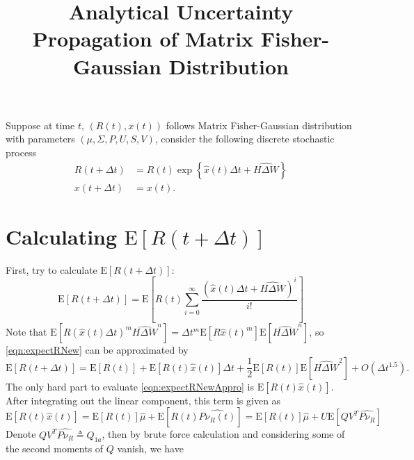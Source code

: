 \documentclass[10pt]{article}
\title{\vspace{-4ex}\textbf{Analytical Uncertainty Propagation of Matrix Fisher-Gaussian Distribution\vspace{-4ex}}}
\date{}
\newcommand{\expect}[1]{\ensuremath{\mathrm{E}\left[ #1 \right]}}
\begin{document}
\maketitle

Suppose at time $t$, $(R(t),x(t))$ follows Matrix Fisher-Gaussian distribution with parameters $(\mu,\Sigma,P,U,S,V)$, consider the following discrete stochastic process
\begin{align}
	R(t+\Delta t) &= R(t)\exp\left\{\hat{x}(t)\Delta t + \widehat{H\Delta W}\right\} \label{eqn:gyroKine} \\
	x(t+\Delta t) &= x(t).
\end{align}

\section{Calculating $\expect{R(t+\Delta t)}$}
First, try to calculate $\expect{R(t+\Delta t)}$:
\begin{equation} \label{eqn:expectRNew}
	\expect{R(t+\Delta t)} = \expect{R(t)\sum_{i=0}^{\infty}\frac{\left(\hat{x}(t)\Delta t + \widehat{H\Delta W}\right)^i}{i!}}
\end{equation}
Note that $\expect{R(\hat{x}(t)\Delta t)^m\widehat{H\Delta W}^n} = \Delta t^m\expect{R\hat{x}(t)^m}\expect{\widehat{H\Delta W}^n}$, so \eqref{eqn:expectRNew} can be approximated by
\begin{equation} \label{eqn:expectRNewAppro}
	\expect{R(t+\Delta t)} = \expect{R(t)} + \expect{R(t)\hat{x}(t)}\Delta t + \frac{1}{2}\expect{R(t)}\expect{\widehat{H\Delta W}^2} + O(\Delta t^{1.5}).
\end{equation}
The only hard part to evaluate \eqref{eqn:expectRNewAppro} is $\expect{R(t)\hat{x}(t)}$.
After integrating out the linear component, this term is given as
\begin{equation}
	\expect{R(t)\hat{x}(t)} = \expect{R(t)}\hat{\mu}+\expect{R(t)\widehat{P\nu_R(t)}} = \expect{R(t)}\hat{\mu}+U\expect{QV^T\widehat{P\nu_R}}
\end{equation}
Denote $QV^T\widehat{P\nu_R} \triangleq Q_{1a}$, then by brute force calculation and considering some of the second moments of $Q$ vanish, we have
\end{document}
